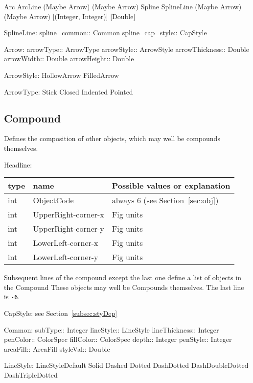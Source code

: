 \documentclass[10pt, a4paper]{article}
\begin{document}
Arc ArcLine (Maybe Arrow) (Maybe Arrow)	 
Spline SplineLine (Maybe Arrow) (Maybe Arrow) [(Integer, Integer)] [Double]


SplineLine:
spline\_common:: Common
spline\_cap\_style:: CapStyle

Arrow:
arrowType:: ArrowType
arrowStyle:: ArrowStyle
arrowThickness:: Double
arrowWidth:: Double
arrowHeight:: Double


ArrowStyle:
HollowArrow	 
FilledArrow	 


ArrowType:
Stick	 
Closed	 
Indented	 
Pointed	 


 
\subsection{Compound}\label{subsec:compound}

Defines the composition of other objects, 
which may well be compounds themselves. 

\noindent
Headline: \\
%
\begin{tabular}{lll}
\toprule
type & name & Possible values or explanation \\
\midrule
\midrule
int & ObjectCode          & always 6 (see Section~\ref{sec:obj}) \\
int & UpperRight-corner-x & Fig units \\
int & UpperRight-corner-y & Fig units \\
int & LowerLeft-corner-x  & Fig units \\
int & LowerLeft-corner-y  & Fig units \\
\bottomrule
\end{tabular}

Subsequent lines of the compound except the last one 
define a list of objects in the Compound
These objects may well be Compounds themselves. 
The last line is \texttt{-6}. 



CapStyle: see Section~\ref{subsec:styDep}








Common:
subType:: Integer
lineStyle:: LineStyle
lineThickness:: Integer
penColor:: ColorSpec
fillColor:: ColorSpec
depth:: Integer
penStyle:: Integer
areaFill:: AreaFill
styleVal:: Double

LineStyle:
LineStyleDefault	 
Solid	 
Dashed	 
Dotted	 
DashDotted	 
DashDoubleDotted	 
DashTripleDotted	 
\end{document}

